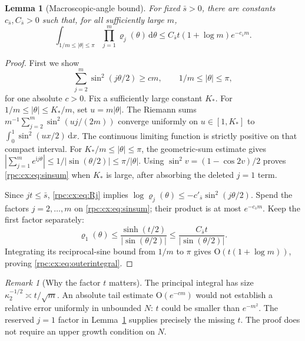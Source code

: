 \documentclass[11pt]{article}
\newtheorem{lemma}[theorem]{Lemma}
\theoremstyle{definition}
\theoremstyle{remark}
\newtheorem{remark}[theorem]{Remark}
\newcommand{\ii}{\mathrm i}
\newcommand{\dd}{\,\mathrm d}
\numberwithin{equation}{section}
\begin{document}
\begin{lemma}[Macroscopic-angle bound]\label{rpc:cx:lem:large}
For fixed $\bar s>0$, there are constants $c_{\bar s},C_{\bar s}>0$ such that, for all
sufficiently large $m$,
\begin{equation}\label{rpc:cx:eq:outerintegral}
 \int_{1/m\le|\theta|\le\pi}\prod_{j=1}^m\varrho_j(\theta)\dd\theta
       \le C_{\bar s}t(1+\log m)e^{-c_{\bar s}m}.
\end{equation}
\end{lemma}
\begin{proof}
First we show
\begin{equation}\label{rpc:cx:eq:sinsum}
 \sum_{j=2}^m\sin^2(j\theta/2)\ge c m,
       \qquad 1/m\le|\theta|\le\pi,
\end{equation}
for one absolute $c>0$. Fix a sufficiently large constant $K_\ast$.
For $1/m\le|\theta|\le K_\ast/m$, set $u=m|\theta|$.
The Riemann sums $m^{-1}\sum_{j=2}^m\sin^2(uj/(2m))$ converge
uniformly on $u\in[1,K_\ast]$ to
$\int_0^1\sin^2(ux/2)\dd x$. The continuous limiting function is
strictly positive on that compact interval.
For $K_\ast/m\le|\theta|\le\pi$, the geometric-sum estimate gives
$|\sum_{j=1}^me^{\ii j\theta}|\le1/|\sin(\theta/2)|\le\pi/|\theta|$.
Using $\sin^2 v=(1-\cos2v)/2$ proves \eqref{rpc:cx:eq:sinsum} when $K_\ast$ is
large, after absorbing the deleted $j=1$ term.

Since $jt\le \bar s$, \eqref{rpc:cx:eq:Rj} implies
$\log \varrho_j(\theta)\le-c'_{\bar s}\sin^2(j\theta/2)$.
Spend the factors $j=2,\ldots,m$ on \eqref{rpc:cx:eq:sinsum}; their product is
at most $e^{-c_{\bar s}m}$. Keep the first factor separately:
\begin{equation}
 \varrho_1(\theta)\le\frac{\sinh(t/2)}{|\sin(\theta/2)|}
               \le\frac{C_{\bar s}t}{|\sin(\theta/2)|}.
\end{equation}
Integrating its reciprocal-sine bound from $1/m$ to $\pi$ gives
$\mathrm O(t(1+\log m))$, proving \eqref{rpc:cx:eq:outerintegral}.
\end{proof}

\begin{remark}[Why the factor $t$ matters]
The principal integral has size $\kappa_2^{-1/2}\asymp t/\sqrt m$.
An absolute tail estimate $\mathrm O(e^{-cm})$ would not establish a relative
error uniformly in unbounded $N$: $t$ could be smaller than $e^{-m^2}$.
The reserved $j=1$ factor in Lemma~\ref{rpc:cx:lem:large} supplies precisely the
missing $t$. The proof does not require an upper growth condition on $N$.
\end{remark}
\end{document}
